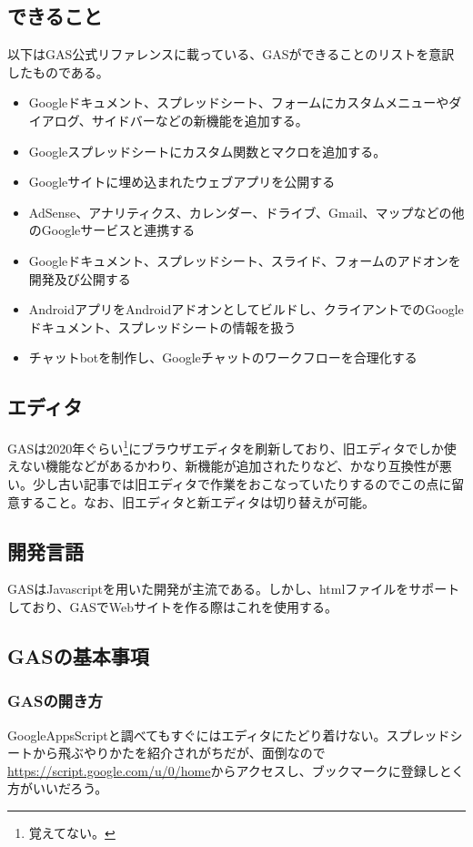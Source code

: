 \documentclass[a4paper]{ltjsreport}
\begin{document}
\subsection{できること}
以下はGAS公式リファレンスに載っている、GASができることのリストを意訳したものである。
\begin{itemize}
  \item Googleドキュメント、スプレッドシート、フォームにカスタムメニューやダイアログ、サイドバーなどの新機能を追加する。
  \item Googleスプレッドシートにカスタム関数とマクロを追加する。
  \item Googleサイトに埋め込まれたウェブアプリを公開する
  \item AdSense、アナリティクス、カレンダー、ドライブ、Gmail、マップなどの他のGoogleサービスと連携する
  \item Googleドキュメント、スプレッドシート、スライド、フォームのアドオンを開発及び公開する
  \item AndroidアプリをAndroidアドオンとしてビルドし、クライアントでのGoogleドキュメント、スプレッドシートの情報を扱う
  \item チャットbotを制作し、Googleチャットのワークフローを合理化する
\end{itemize}
\subsection{エディタ}
GASは2020年ぐらい\footnote{覚えてない。}にブラウザエディタを刷新しており、旧エディタでしか使えない機能などがあるかわり、新機能が追加されたりなど、かなり互換性が悪い。少し古い記事では旧エディタで作業をおこなっていたりするのでこの点に留意すること。なお、旧エディタと新エディタは切り替えが可能。
\subsection{開発言語}
GASはJavascriptを用いた開発が主流である。しかし、htmlファイルをサポートしており、GASでWebサイトを作る際はこれを使用する。
\subsection{GASの基本事項}
\subsubsection{GASの開き方}
GoogleAppsScriptと調べてもすぐにはエディタにたどり着けない。スプレッドシートから飛ぶやりかたを紹介されがちだが、面倒なので\url{https://script.google.com/u/0/home}からアクセスし、ブックマークに登録しとく方がいいだろう。
\end{document}
